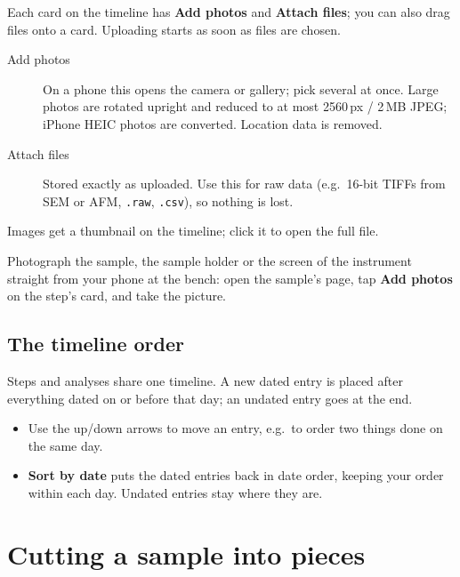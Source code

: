 \documentclass[11pt,a4paper]{article}
\newcommand{\ui}[1]{\textsf{\textbf{#1}}}
\begin{document}
Each card on the timeline has \ui{Add photos} and \ui{Attach files}; you
can also drag files onto a card. Uploading starts as soon as files are
chosen.

\begin{description}
  \item[Add photos] On a phone this opens the camera or gallery; pick
    several at once. Large photos are rotated upright and reduced to at
    most 2560\,px / 2\,MB JPEG; iPhone HEIC photos are converted. Location
    data is removed.
  \item[Attach files] Stored exactly as uploaded. Use this for raw data
    (e.g.\ 16-bit TIFFs from SEM or AFM, \texttt{.raw}, \texttt{.csv}), so
    nothing is lost.
\end{description}

Images get a thumbnail on the timeline; click it to open the full file.

\begin{tip}
Photograph the sample, the sample holder or the screen of the instrument
straight from your phone at the bench: open the sample's page, tap
\ui{Add photos} on the step's card, and take the picture.
\end{tip}

\subsection{The timeline order}
\label{sec:timeline}

Steps and analyses share one timeline. A new dated entry is placed after
everything dated on or before that day; an undated entry goes at the end.

\begin{itemize}
  \item Use the up/down arrows to move an entry, e.g.\ to order two things
        done on the same day.
  \item \ui{Sort by date} puts the dated entries back in date order, keeping
        your order within each day. Undated entries stay where they are.
\end{itemize}

\section{Cutting a sample into pieces}
\label{sec:cut}
\end{document}
